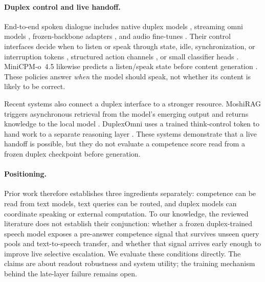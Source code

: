 \paragraph{Duplex control and live handoff.}
End-to-end spoken dialogue includes native duplex models
\citep{nguyen2023generative,defossez2024moshi,zeng2024glm4voice,
bayling2026duplex}, streaming omni models
\citep{xu2025qwen25omni,openbmb2026minicpmo}, frozen-backbone adapters
\citep{wang2024freezeomni}, and audio fine-tunes
\citep{chu2024qwen2audio}. Their control interfaces decide when to
listen or speak through state, idle, synchronization, or interruption
tokens \citep{wang2024fsm,zhang2024duplex,veluri2024syncllm,
ma2024lslm,fu2024vita,yu2024salmonnomni}, structured action channels
\citep{zhang2026duplexsla}, or small classifier heads
\citep{liao2025flexduo,chen2025minmo}. MiniCPM-o~4.5 likewise predicts
a listen/speak state before content generation
\citep{openbmb2026minicpmo}. These policies answer \emph{when} the
model should speak, not whether its content is likely to be correct.

Recent systems also connect a duplex interface to a stronger resource.
MoshiRAG triggers asynchronous retrieval from the model's emerging
output and returns knowledge to the local model
\citep{chien2026moshirag}. DuplexOmni uses a trained think-control
token to hand work to a separate reasoning layer
\citep{huang2026duplexomni}. These systems demonstrate that a live
handoff is possible, but they do not evaluate a competence score read
from a frozen duplex checkpoint before generation.

\paragraph{Positioning.}
Prior work therefore establishes three ingredients separately:
competence can be read from text models, text queries can be routed,
and duplex models can coordinate speaking or external computation.
To our knowledge, the reviewed literature does not establish their
conjunction: whether a frozen duplex-trained speech model exposes a
pre-answer competence signal that survives unseen query pools and
text-to-speech transfer, and whether that signal arrives early enough
to improve live selective escalation. We evaluate these conditions
directly. The claims are about readout robustness and system utility;
the training mechanism behind the late-layer failure remains open.
